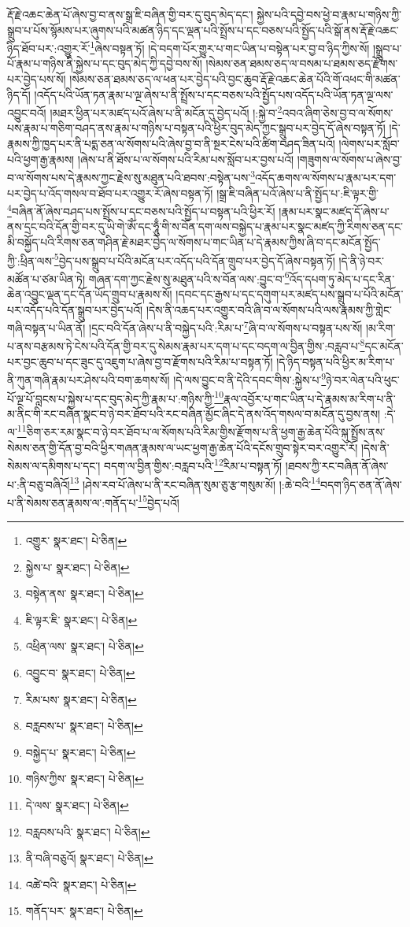 རྡོ་རྗེ་འཆང་ཆེན་པོ་ཞེས་བྱ་བ་ནས་སྒྲ་ཇི་བཞིན་གྱི་བར་དུ་བུད་མེད་དང་། སྐྱེས་པའི་དབྱེ་བས་ཕྱེ་བ་རྣམ་པ་གཉིས་ཀྱི་སྒྲུབ་པ་པོས་སྙོམས་པར་ཞུགས་པའི་མཚན་ཉིད་དང་ལྡན་པའི་སྤྲོས་པ་དང་བཅས་པའི་སྤྱོད་པའི་སྒོ་ནས་རྡོ་རྗེ་འཆང་ཉིད་ཐོབ་པར་:འགྱུར་རོ་\footnote{འགྱུར་  སྣར་ཐང་།  པེ་ཅིན། }ཞེས་བསྟན་ཏོ། །དེ་བདག་པོར་གྱུར་པ་གང་ཡིན་པ་བསྟེན་པར་བྱ་བ་ཉིད་ཀྱིས་སོ། །སྒྲུབ་པ་པོ་རྣམ་པ་གཉིས་ནི་སྐྱེས་པ་དང་བུད་མེད་ཀྱི་དབྱེ་བས་སོ། །སེམས་ཅན་ཐམས་ཅད་ལ་བསམ་པ་ཐམས་ཅད་རྫོགས་པར་བྱེད་པས་སོ། །སེམས་ཅན་ཐམས་ཅད་ལ་ཕན་པར་བྱེད་པའི་བྱང་ཆུབ་རྡོ་རྗེ་འཆང་ཆེན་པོའི་གོ་འཕང་གི་མཚན་ཉིད་དོ། །འདོད་པའི་ཡོན་ཏན་རྣམ་པ་ལྔ་ཞེས་པ་ནི་སྤྲོས་པ་དང་བཅས་པའི་སྤྱོད་པས་འདོད་པའི་ཡོན་ཏན་ལྔ་ལས་འབྱུང་བའོ། །མཐར་ཕྱིན་པར་མཛད་པའོ་ཞེས་པ་ནི་མངོན་དུ་བྱེད་པའོ། །:སྐྱེ་བ་\footnote{སྐྱེས་པ་  སྣར་ཐང་།  པེ་ཅིན། }འབའ་ཞིག་ཅེས་བྱ་བ་ལ་སོགས་པས་རྣམ་པ་གཅིག་བཤད་ནས་རྣམ་པ་གཉིས་པ་བསྟན་པའི་ཕྱིར་བུད་མེད་ཀྱང་སྒྲུབ་པར་བྱེད་དོ་ཞེས་བསྟན་ཏོ། །དེ་རྣམས་ཀྱི་ཁྱད་པར་ནི་པདྨ་ཅན་ལ་སོགས་པའི་ཞེས་བྱ་བ་ནི་སྔར་ངེས་པའི་ཚིག་བཤད་ཟིན་པའོ། །ལེགས་པར་སློབ་པའི་ཕྱག་རྒྱ་རྣམས། །ཞེས་པ་ནི་ཐོས་པ་ལ་སོགས་པའི་རིམ་པས་སློབ་པར་བྱས་པའོ། །གཟུགས་ལ་སོགས་པ་ཞེས་བྱ་བ་ལ་སོགས་པས་དེ་རྣམས་ཀྱང་རྗེས་སུ་མཐུན་པའི་ཐབས་:བསྟེན་པས་\footnote{བསྟེན་ནས་  སྣར་ཐང་།  པེ་ཅིན། }འདོད་ཆགས་ལ་སོགས་པ་རྣམ་པར་དག་པར་བྱེད་པ་འོད་གསལ་བ་ཐོབ་པར་འགྱུར་རོ་ཞེས་བསྟན་ཏོ། །སྒྲ་ཇི་བཞིན་པའོ་ཞེས་པ་ནི་སྤྱོད་པ་:ཇི་ལྟར་གྱི་\footnote{ཇི་ལྟར་ཇི་  སྣར་ཐང་།  པེ་ཅིན། }བཞིན་ནོ་ཞེས་བཤད་པས་སྤྲོས་པ་དང་བཅས་པའི་སྤྱོད་པ་བསྟན་པའི་ཕྱིར་རོ། །རྣམ་པར་སྣང་མཛད་དོ་ཞེས་པ་ནས་དྲང་བའི་དོན་གྱི་བར་དུ་ཡི་གེ་ཨོཾ་དང་ཧཱུྃ་གི་ས་བོན་དག་ལས་བསྐྱེད་པ་རྣམ་པར་སྣང་མཛད་ཀྱི་རིགས་ཅན་དང་མི་བསྐྱོད་པའི་རིགས་ཅན་གཤིན་རྗེ་མཐར་བྱེད་ལ་སོགས་པ་གང་ཡིན་པ་དེ་རྣམས་ཀྱིས་ཞི་བ་དང་མངོན་སྤྱོད་ཀྱི་:ཕྲིན་ལས་\footnote{འཕྲིན་ལས་  སྣར་ཐང་།  པེ་ཅིན། }བྱེད་པས་སྒྲུབ་པ་པོའི་མངོན་པར་འདོད་པའི་དོན་གྲུབ་པར་བྱེད་དོ་ཞེས་བསྟན་ཏོ། །དེ་ནི་ཉེ་བར་མཚོན་པ་ཙམ་ཡིན་ཏེ། གཞན་དག་ཀྱང་རྗེས་སུ་མཐུན་པའི་ས་བོན་ལས་:བྱུང་བ་\footnote{འབྱུང་བ་  སྣར་ཐང་།  པེ་ཅིན། }འོད་དཔག་ཏུ་མེད་པ་དང་རིན་ཆེན་འབྱུང་ལྡན་དང་དོན་ཡོད་གྲུབ་པ་རྣམས་སོ། །དབང་དང་རྒྱས་པ་དང་དགུག་པར་མཛད་པས་སྒྲུབ་པ་པོའི་མངོན་པར་འདོད་པའི་དོན་སྒྲུབ་པར་བྱེད་པའོ། །དེས་ནི་འཆད་པར་འགྱུར་བའི་ཞི་བ་ལ་སོགས་པའི་ལས་རྣམས་ཀྱི་གླེང་གཞི་བསྟན་པ་ཡིན་ནོ། །དྲང་བའི་དོན་ཞེས་པ་ནི་བསྐྱེད་པའི་:རིམ་པ་\footnote{རིམ་པས་  སྣར་ཐང་།  པེ་ཅིན། }ཞི་བ་ལ་སོགས་པ་བསྟན་པས་སོ། །མ་རིག་པ་ནས་བརྩམས་ཏེ་ངེས་པའི་དོན་གྱི་བར་དུ་སེམས་རྣམ་པར་དག་པ་དང་བདག་ལ་བྱིན་གྱིས་:བརླབ་པ་\footnote{བརླབས་པ་  སྣར་ཐང་།  པེ་ཅིན། }དང་མངོན་པར་བྱང་ཆུབ་པ་དང་ཟུང་དུ་འཇུག་པ་ཞེས་བྱ་བ་རྫོགས་པའི་རིམ་པ་བསྟན་ཏོ། །དེ་ཉིད་བསྟན་པའི་ཕྱིར་མ་རིག་པ་ནི་ཀུན་གཞི་རྣམ་པར་ཤེས་པའི་བག་ཆགས་སོ། །དེ་ལས་བྱུང་བ་ནི་དེའི་དབང་གིས་:སྐྱེས་པ་\footnote{བསྐྱེད་པ་  སྣར་ཐང་།  པེ་ཅིན། }ཉེ་བར་ལེན་པའི་ཕུང་པོ་ལྔ་པོ་བླངས་པ་སྐྱེས་པ་དང་བུད་མེད་ཀྱི་རྣམ་པ་:གཉིས་ཀྱི་\footnote{གཉིས་ཀྱིས་  སྣར་ཐང་།  པེ་ཅིན། }རྣལ་འབྱོར་པ་གང་ཡིན་པ་དེ་རྣམས་མ་རིག་པ་ནི་མ་ནིང་གི་རང་བཞིན་སྣང་བ་ཉེ་བར་ཐོབ་པའི་རང་བཞིན་མྱོང་ཞིང་དེ་ནས་འོད་གསལ་བ་མངོན་དུ་བྱས་ནས། :དེ་ལ་\footnote{དེ་ལས་  སྣར་ཐང་།  པེ་ཅིན། }ཅིག་ཅར་རམ་སྣང་བ་ཉེ་བར་ཐོབ་པ་ལ་སོགས་པའི་རིམ་གྱིས་རྫོགས་པ་ནི་ཕྱག་རྒྱ་ཆེན་པོའི་སྐུ་སྤྲོས་ནས་སེམས་ཅན་གྱི་དོན་བྱ་བའི་ཕྱིར་གཞན་རྣམས་ལ་ཡང་ཕྱག་རྒྱ་ཆེན་པོའི་དངོས་གྲུབ་སྟེར་བར་འགྱུར་རོ། །དེས་ནི་སེམས་ལ་དམིགས་པ་དང་། བདག་ལ་བྱིན་གྱིས་:བརླབ་པའི་\footnote{བརླབས་པའི་  སྣར་ཐང་།  པེ་ཅིན། }རིམ་པ་བསྟན་ཏོ། །ཐབས་ཀྱི་རང་བཞིན་ནོ་ཞེས་པ་:ནི་བཅུ་བཞིའོ།\footnote{ནི་བཞི་བཅུའོ།  སྣར་ཐང་།  པེ་ཅིན། } །ཤེས་རབ་པོ་ཞེས་པ་ནི་རང་བཞིན་སུམ་ཅུ་རྩ་གསུམ་མོ། །:ཆེ་བའི་\footnote{འཚེ་བའི་  སྣར་ཐང་།  པེ་ཅིན། }བདག་ཉིད་ཅན་ནོ་ཞེས་པ་ནི་སེམས་ཅན་རྣམས་ལ་:གནོད་པ་\footnote{གནོད་པར་  སྣར་ཐང་།  པེ་ཅིན། }བྱེད་པའོ། 